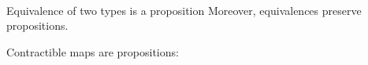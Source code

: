 \begin{code}
\AgdaSymbol{)}\AgdaSpace{}%
\AgdaSpace{}%
\AgdaSpace{}%
\<%
\\
%
\>[8]\AgdaSpace{}%
\AgdaSpace{}%
\AgdaSymbol{=}\AgdaSpace{}%
\AgdaSpace{}%
\AgdaSpace{}%
\AgdaSpace{}%
\AgdaSpace{}%
\AgdaSymbol{(}\AgdaOperator{\AgdaFunction{!}}\AgdaSpace{}%
\AgdaSpace{}%
\AgdaSymbol{(}\AgdaSpace{}%
\AgdaSymbol{)}\AgdaSpace{}%
\AgdaSymbol{)}\AgdaSpace{}%
\AgdaSpace{}%
\AgdaSymbol{(}\AgdaSpace{}%
\AgdaSymbol{(}\AgdaSpace{}%
\AgdaSymbol{)}\AgdaSpace{}%
\AgdaSymbol{)}\<%
\end{code}

Equivalence of two types is a proposition
Moreover, equivalences preserve propositions.

Contractible maps are propositions:

\begin{code}%
%
\>[2]\<%
\\
\>[2][@{}l@{\AgdaIndent{0}}]%
\>[4]\AgdaSymbol{:}\AgdaSpace{}%
\AgdaSymbol{\{}\AgdaSpace{}%
\AgdaSymbol{:}\AgdaSpace{}%
\AgdaSpace{}%
\AgdaSymbol{\}}\AgdaSpace{}%
\AgdaSymbol{\{}\AgdaSpace{}%
\AgdaSymbol{:}\AgdaSpace{}%
\AgdaSpace{}%
\AgdaSymbol{\}}\<%
\\
%
\>[4]\AgdaSpace{}%
\AgdaSymbol{(}\AgdaSpace{}%
\AgdaSymbol{:}\AgdaSpace{}%
\AgdaSpace{}%
\AgdaSpace{}%
\AgdaSymbol{)}\<%
\\
%
\>[4]\AgdaComment{-------------}\<%
\\
%
\>[4]\AgdaSpace{}%
\AgdaSpace{}%
\AgdaSymbol{(}\AgdaSpace{}%
\AgdaSymbol{)}\<%
\\
%
\\[\AgdaEmptyExtraSkip]%
%
\>[2]\AgdaSpace{}%
\AgdaSpace{}%
\AgdaSymbol{=}\AgdaSpace{}%
\AgdaSpace{}%
\AgdaSpace{}%
\AgdaSpace{}%
\AgdaSpace{}%
\AgdaSymbol{)}\<%
\end{code}


